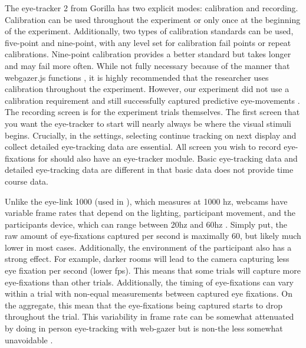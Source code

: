 The eye-tracker 2 from Gorilla has two explicit modes: calibration and recording. Calibration can be used throughout the experiment or only once at the beginning of the experiment. Additionally, two types of calibration standards can be used, five-point and nine-point, with any level set for calibration fail points or repeat calibrations. Nine-point calibration provides a better standard but takes longer and may fail more often. While not fully necessary because of the manner that webgazer.js functions \parencite[e.g.,][]{e.g., Chen_et_al_2001}, it is highly recommended that the researcher uses calibration throughout the experiment. However, our experiment did not use a calibration requirement and still successfully captured predictive eye-movements \parencite[][]{Prystauka_Altmann_Rothman_2023}. The recording screen is for the experiment trials themselves. The first screen that you want the eye-tracker to start will nearly always be where the visual stimuli begins. Crucially, in the settings, selecting continue tracking on next display and collect detailed eye-tracking data are essential. All screen you wish to record eye-fixations for should also have an eye-tracker module. Basic eye-tracking data and detailed eye-tracking data are different in that basic data does not provide time course data. 

Unlike the eye-link 1000 (used in \parencite{Porretta_et_al_2020}), which measures at 1000 hz, webcams have variable frame rates that depend on the lighting, participant movement, and the participants device, which can range between 20hz and 60hz \parencite{Vos_2017}. Simply put, the raw amount of eye-fixations captured per second is maximally 60, but likely much lower in most cases. Additionally, the environment of the participant also has a strong effect. For example, darker rooms will lead to the camera capturing less eye fixation per second (lower fps). This means that some trials will capture more eye-fixations than other trials. \parencite{} Additionally, the timing of eye-fixations can vary within a trial with non-equal measurements between captured eye fixations. On the aggregate, this mean that the eye-fixations being captured starts to drop throughout the trial. This variability in frame rate can be somewhat attenuated by doing in person eye-tracking with web-gazer but is non-the less somewhat unavoidable \parencite[e.g.,][]{}{}{}. 

